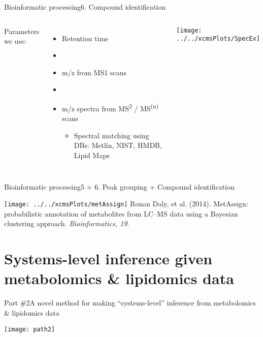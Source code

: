\documentclass[xcolor=dvipsnames]{beamer}
\begin{document}
\begin{frame}{Bioinformatic processing}{6. Compound identification}
\vspace{-11pt}
\begin{columns}
	Parameters we use:
		\begin{itemize}
			\item Retention time \pause
			\item[]
			\item m/z from MS1 scans \pause
			\item[]
			\item m/z spectra from MS\textsuperscript{2} / MS\textsuperscript{(n)} scans \pause
			\begin{itemize}
				\item Spectral matching using DBs: Metlin, NIST, HMDB, Lipid Maps
			\end{itemize}
		\end{itemize}
	\begin{center}
			\texttt{[image: ../../xcmsPlots/SpecEx]}
	\end{center}
\end{columns}
\end{frame}

\begin{frame}{Bioinformatic processing}{5 + 6. Peak grouping + Compound identification}
\vspace{-10pt}
\begin{center}
	\texttt{[image: ../../xcmsPlots/metAssign]}
	\vspace{5mm}
	\tiny{Ronan Daly, et al. (2014). MetAssign: probabilistic annotation of metabolites from LC–MS data using a Bayesian clustering approach. \emph{Bioinformatics, 19}.}
\end{center}
\end{frame}

\section{Systems-level inference given metabolomics \& lipidomics data}

\begin{frame}{Part \#2}{A novel method for making ``systems-level'' inference from metabolomics \& lipidomics data}
\vspace{-15pt}
\begin{center}
	\texttt{[image: path2]}
\end{center}
\end{frame}
\end{document}
